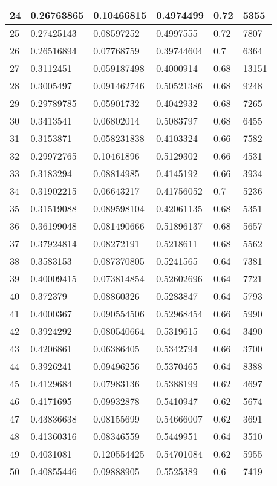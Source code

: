 \begin{longtable}{|l|l|l|l|l|l|}
24 & 0.26763865 & 0.10466815 & 0.4974499 & 0.72 & 5355 \\ \hline 
25 & 0.27425143 & 0.08597252 & 0.4997555 & 0.72 & 7807 \\ \hline 
26 & 0.26516894 & 0.07768759 & 0.39744604 & 0.7 & 6364 \\ \hline 
27 & 0.3112451 & 0.059187498 & 0.4000914 & 0.68 & 13151 \\ \hline 
28 & 0.3005497 & 0.091462746 & 0.50521386 & 0.68 & 9248 \\ \hline 
29 & 0.29789785 & 0.05901732 & 0.4042932 & 0.68 & 7265 \\ \hline 
30 & 0.3413541 & 0.06802014 & 0.5083797 & 0.68 & 6455 \\ \hline 
31 & 0.3153871 & 0.058231838 & 0.4103324 & 0.66 & 7582 \\ \hline 
32 & 0.29972765 & 0.10461896 & 0.5129302 & 0.66 & 4531 \\ \hline 
33 & 0.3183294 & 0.08814985 & 0.4145192 & 0.66 & 3934 \\ \hline 
34 & 0.31902215 & 0.06643217 & 0.41756052 & 0.7 & 5236 \\ \hline 
35 & 0.31519088 & 0.089598104 & 0.42061135 & 0.68 & 5351 \\ \hline 
36 & 0.36199048 & 0.081490666 & 0.51896137 & 0.68 & 5657 \\ \hline 
37 & 0.37924814 & 0.08272191 & 0.5218611 & 0.68 & 5562 \\ \hline 
38 & 0.3583153 & 0.087370805 & 0.5241565 & 0.64 & 7381 \\ \hline 
39 & 0.40009415 & 0.073814854 & 0.52602696 & 0.64 & 7721 \\ \hline 
40 & 0.372379 & 0.08860326 & 0.5283847 & 0.64 & 5793 \\ \hline 
41 & 0.4000367 & 0.090554506 & 0.52968454 & 0.66 & 5990 \\ \hline 
42 & 0.3924292 & 0.080540664 & 0.5319615 & 0.64 & 3490 \\ \hline 
43 & 0.4206861 & 0.06386405 & 0.5342794 & 0.66 & 3700 \\ \hline 
44 & 0.3926241 & 0.09496256 & 0.5370465 & 0.64 & 8388 \\ \hline 
45 & 0.4129684 & 0.07983136 & 0.5388199 & 0.62 & 4697 \\ \hline 
46 & 0.4171695 & 0.09932878 & 0.5410947 & 0.62 & 5674 \\ \hline 
47 & 0.43836638 & 0.08155699 & 0.54666007 & 0.62 & 3691 \\ \hline 
48 & 0.41360316 & 0.08346559 & 0.5449951 & 0.64 & 3510 \\ \hline 
49 & 0.4031081 & 0.120554425 & 0.54701084 & 0.62 & 5955 \\ \hline 
50 & 0.40855446 & 0.09888905 & 0.5525389 & 0.6 & 7419 \\ \hline 
\end{longtable}